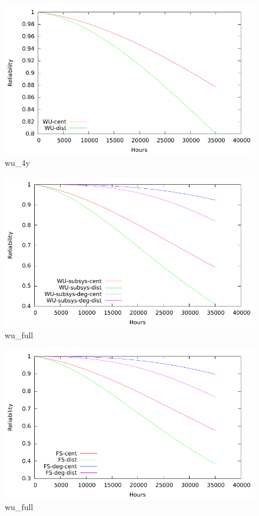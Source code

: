 \begin{figure}[H]
  \centering
  \includegraphics{plots/WU.pdf}
  \caption{wu\_4y}
  \label{fig:wu_4y}
\end{figure}
\begin{figure}[H]
  \centering
  \includegraphics{plots/WUs.pdf}
  \caption{wu\_full}
  \label{fig:wu_full}
\end{figure}
\begin{figure}[H]
  \centering
  \includegraphics{plots/FS.pdf}
  \caption{wu\_full}
  \label{fig:wu_full}
\end{figure}
